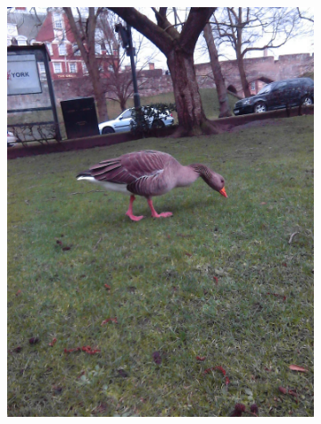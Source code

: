 \documentclass{l4proj}
\begin{document}
\begin{figure}[ht]
\begin{subfigure}[h!]{0.18\textwidth}
    \includegraphics[width=\textwidth, trim={0cm 6cm 0cm 6cm}, clip]{images/dataset/goose/rgb.png}

\end{subfigure}
\end{figure}
\end{document}
